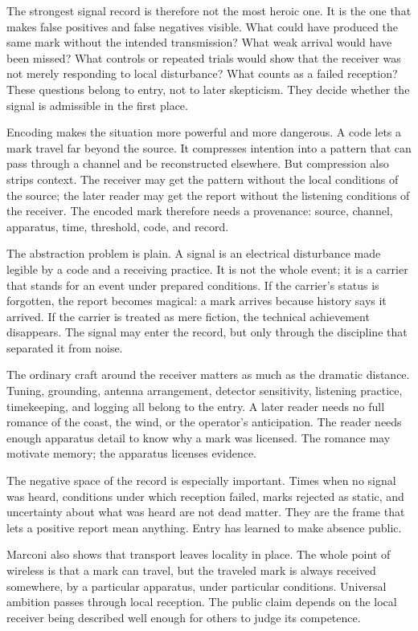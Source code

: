 The strongest signal record is therefore not the most heroic one. It is the
one that makes false positives and false negatives visible. What could have
produced the same mark without the intended transmission? What weak arrival
would have been missed? What controls or repeated trials would show that the
receiver was not merely responding to local disturbance? What counts as a
failed reception? These questions belong to entry, not to later skepticism.
They decide whether the signal is admissible in the first place.

Encoding makes the situation more powerful and more dangerous. A code lets a
mark travel far beyond the source. It compresses intention into a pattern that
can pass through a channel and be reconstructed elsewhere. But compression
also strips context. The receiver may get the pattern without the local
conditions of the source; the later reader may get the report without the
listening conditions of the receiver. The encoded mark therefore needs a
provenance: source, channel, apparatus, time, threshold, code, and record.

The abstraction problem is plain. A signal is an electrical disturbance made
legible by a code and a receiving practice. It is not the whole event; it is a
carrier that stands for an event under prepared conditions. If the carrier's
status is forgotten, the report becomes magical: a mark arrives because history
says it arrived. If the carrier is treated as mere fiction, the technical
achievement disappears. The signal may enter the record, but only through the
discipline that separated it from noise.

The ordinary craft around the receiver matters as much as the dramatic
distance. Tuning, grounding, antenna arrangement, detector sensitivity,
listening practice, timekeeping, and logging all belong to the entry. A later
reader needs no full romance of the coast, the wind, or the operator's
anticipation. The reader needs enough apparatus detail to know why a
mark was licensed. The romance may motivate memory; the apparatus licenses
evidence.

The negative space of the record is especially important. Times when no
signal was heard, conditions under which reception failed, marks rejected
as static, and uncertainty about what was heard are not dead matter. They
are the frame that lets a positive report mean anything. Entry has
learned to make absence public.

Marconi also shows that transport leaves locality in place. The whole point of
wireless is that a mark can travel, but the traveled mark is always received
somewhere, by a particular apparatus, under particular conditions. Universal
ambition passes through local reception. The public claim depends on the local
receiver being described well enough for others to judge its competence.

